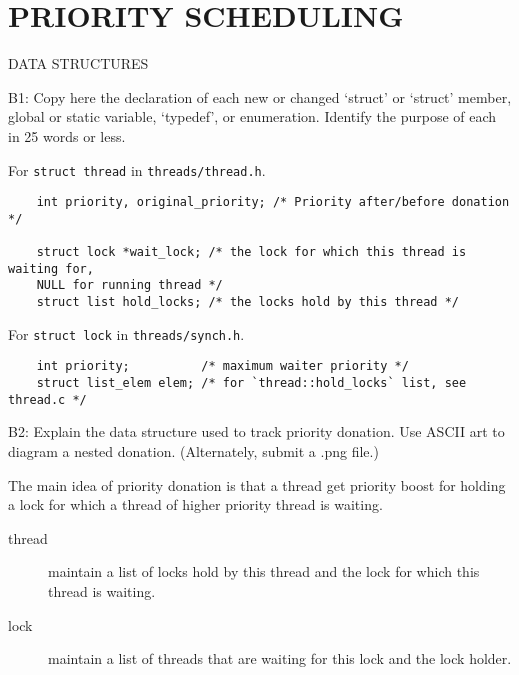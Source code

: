 \section{PRIORITY SCHEDULING}
\begin{aspect}{DATA STRUCTURES}
	\begin{qc}
		B1: Copy here the declaration of each new or changed `struct' or `struct' member, global or static variable, `typedef', or enumeration.  Identify the purpose of each in 25 words or less.
	\end{qc}

	For \lstinline{struct thread} in \lstinline{threads/thread.h}.
	\begin{lstlisting}
    int priority, original_priority; /* Priority after/before donation */

    struct lock *wait_lock; /* the lock for which this thread is waiting for,
    NULL for running thread */
    struct list hold_locks; /* the locks hold by this thread */
        \end{lstlisting}

	For \lstinline{struct lock} in \lstinline{threads/synch.h}.
	\begin{lstlisting}
    int priority;          /* maximum waiter priority */
    struct list_elem elem; /* for `thread::hold_locks` list, see thread.c */
        \end{lstlisting}

	\begin{qc}
		B2: Explain the data structure used to track priority donation.
		Use ASCII art to diagram a nested donation.  (Alternately, submit a
		.png file.)
	\end{qc}

	The main idea of priority donation is that
	a thread get priority boost for holding a lock for which a thread of higher priority thread is waiting.
	\begin{description}
		\item[thread] maintain a list of locks hold by this thread and the lock for which this thread is waiting.
		\item[lock] maintain a list of threads that are waiting for this lock and the lock holder.
	\end{description}

\end{aspect}

